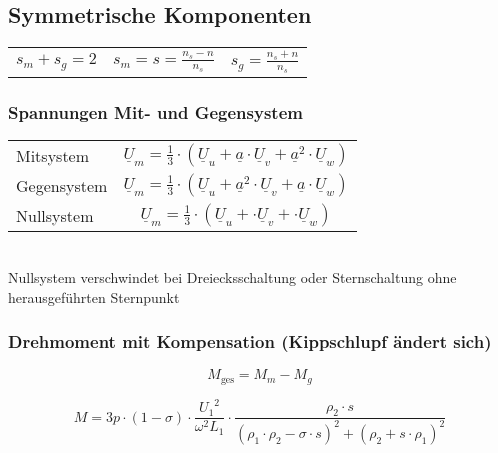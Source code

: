 \begin{sectionbox}
\subsection{Symmetrische Komponenten}
\begin{symbolbox}
\begin{tabularx}{\columnwidth}{>{\centering\arraybackslash}Xc>{\centering\arraybackslash}X}
$s_m + s_g = 2$ & $s_m = s = \frac{n_s - n}{n_s}$ & $s_g = \frac{n_s + n}{n_s}$
\end{tabularx}
\end{symbolbox}

\subsubsection{Spannungen Mit- und Gegensystem}
\begin{tabular}{lc}
Mitsystem & $\underline{U}_m = \frac{1}{3}\cdot (\underline{U}_u + \underline{a}\cdot\underline{U}_v + \underline{a}^2 \cdot \underline{U}_w)$\\
Gegensystem & $\underline{U}_m = \frac{1}{3}\cdot (\underline{U}_u + \underline{a}^2\cdot\underline{U}_v + \underline{a} \cdot \underline{U}_w)$\\
Nullsystem & $\underline{U}_m = \frac{1}{3}\cdot (\underline{U}_u + \cdot\underline{U}_v + \cdot \underline{U}_w)$
\end{tabular}\\
Nullsystem verschwindet bei Dreiecksschaltung oder Sternschaltung ohne herausgeführten Sternpunkt\\

\subsubsection{Drehmoment mit Kompensation (Kippschlupf ändert sich)}
\[M_\text{ges} = M_m - M_g\]
\begin{emphbox}
\[M = 3p\cdot (1-\sigma)\cdot\frac{{U_1}^2}{{\omega}^2 L_1} \cdot\frac{\rho_2 \cdot s}{(\rho_1\cdot\rho_2 -\sigma\cdot s)^2 +(\rho_2 +s\cdot\rho_1)^2}\]
\end{emphbox}
\end{sectionbox}
